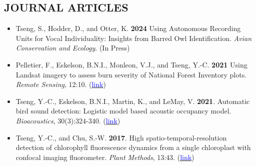 \documentclass[11pt,letterpaper,sans]{moderncv}        %
\begin{document}
\subsection{JOURNAL ARTICLES}
\begin{itemize}

\item{Tseng, S., Hodder, D., and Otter, K. \textbf{2024} Using Autonomous Recording Units for Vocal Individuality: Insights from Barred Owl Identification. \textit{Avian Conservation and Ecology}. (In Press)}
\vspace{3pt}

\item{Pelletier, F., Eskelson, B.N.I., Monleon, V.J., and Tseng, Y.-C. \textbf{2021} Using Landsat imagery to assess burn severity of National Forest Inventory plots. \textit{Remote Sensing}, 12:10. (\href{https://www.mdpi.com/2072-4292/13/10/1935}{\textcolor{blue}{link}})}
\vspace{3pt}

\item{Tseng, Y.-C., Eskelson, B.N.I., Martin, K., and LeMay, V. \textbf{2021}. Automatic bird sound detection: Logistic model based acoustic occupancy model. \textit{Bioacoustics}, 30(3):324-340. (\href{https://www.tandfonline.com/doi/abs/10.1080/09524622.2020.1730241}{\textcolor{blue}{link}})}
\vspace{3pt}

\item{Tseng, Y.-C., and Chu, S.-W. \textbf{2017}. High spatio-temporal-resolution detection of chlorophyll fluorescence dynamics from a single chloroplast with confocal imaging fluorometer. \textit{Plant Methods}, 13:43. (\href{https://doi.org/10.1186/s13007-017-0194-2}{\textcolor{blue}{link}})}

\end{itemize}

\end{document}
